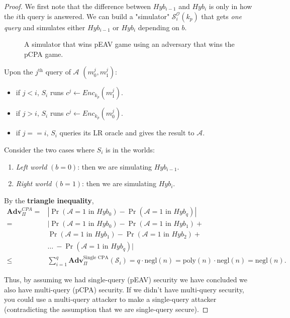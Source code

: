 \begin{proof}
	We first note that the difference between \(Hyb_{i - 1}\) and \(Hyb_i\) is only in how the \(i\)th query is answered. We can build a "simulator" \(\mathcal{S}_i^{\mathcal{O}}(k_p)\) that gets \emph{one query} and simulates either \(Hyb_{i - 1}\) or \(Hyb_i\) depending on \(b\).

	\begin{figure}[H]
		\centering
		\caption{A simulator that wins pEAV game using an adversary that wins the pCPA game.}
		\label{fig:onemanycpa}
	\end{figure}

	Upon the \(j^\text{th} \) query of \(\mathcal{A} \) \((m_0^j, m_1^j)\):
	\begin{itemize}
		\item if \(j < i\), \(S_i\) runs \(c^j \gets Enc_{k_p}(m_1^j)\).
		\item if \(j > i\), \(S_i\) runs \(c^j \gets Enc_{k_p}(m_0^j)\).
		\item if \(j == i\), \(S_i\) queries its LR oracle and gives the result to \(\mathcal{A} \).
	\end{itemize}
	
	Consider the two cases where \(S_i\) is in the worlds:
	\begin{enumerate}[label=(\roman*)]
		\item \emph{Left world} \((b=0)\): then we are simulating \(Hyb_{i-1}\).
		\item \emph{Right world} \((b=1)\): then we are simulating \(Hyb_i\). 
	\end{enumerate}

	By the \textbf{triangle inequality},
	\begin{align*}
		\mathbf{Adv}_\Pi^{CPA} =& \left|
			\Pr(\mathcal{A} = 1 \text{ in } Hyb_0) -
			\Pr(\mathcal{A} = 1 \text{ in } Hyb_q)
		\right| \\
		=& |
			\Pr(\mathcal{A} = 1 \text{ in } Hyb_0) -
			\Pr(\mathcal{A} = 1 \text{ in } Hyb_1) + \\
			&\Pr(\mathcal{A} = 1 \text{ in } Hyb_1) -
			\Pr(\mathcal{A} = 1 \text{ in } Hyb_2) + \\
			&\ldots \: - \Pr(\mathcal{A} = 1 \text{ in } Hyb_q)
		| \\
		\leq& \sum_{i=1}^q \mathbf{Adv}_\Pi^\text{Single CPA} (\mathcal{S}_i) = q \cdot \mathrm{negl}(n) = \mathrm{poly}(n) \cdot \mathrm{negl}(n) = \mathrm{negl}(n).
	\end{align*}

	Thus, by assuming we had single-query (pEAV) security we have concluded we also have multi-query (pCPA) security. If we didn't have multi-query security, you could use a multi-query attacker to make a single-query attacker (contradicting the assumption that we are single-query secure).
\end{proof}

